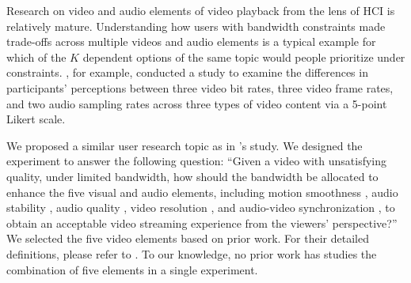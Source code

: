 Research on video and audio elements of video playback from the lens of HCI is relatively mature. Understanding how users with bandwidth constraints made trade-offs across multiple videos and audio elements \cite{molnar2013comedy, oeldorf2012bad} is a typical example for which of the $K$ dependent options of the same topic would people prioritize under constraints. \textcite{oeldorf2012bad}, for example, conducted a study to examine the differences in participants' perceptions between three video bit rates, three video frame rates, and two audio sampling rates across three types of video content via a 5-point Likert scale. 

We proposed a similar user research topic as in \textcite{oeldorf2012bad}'s study. We designed the experiment to answer the following question: ``Given a video with unsatisfying quality, under limited bandwidth, how should the bandwidth be allocated to enhance the five visual and audio elements, including motion smoothness \cite{huynh2008temporal}, audio stability \cite{hardman1998successful}, audio quality \cite{knoche2008low}, video resolution \cite{knoche2005can}, and audio-video synchronization \cite{steinmetz1996human}, to obtain an acceptable video streaming experience from the viewers' perspective?'' We selected the five video elements based on prior work. For their detailed definitions, please refer to . To our knowledge, no prior work has studies the combination of five elements in a single experiment.

